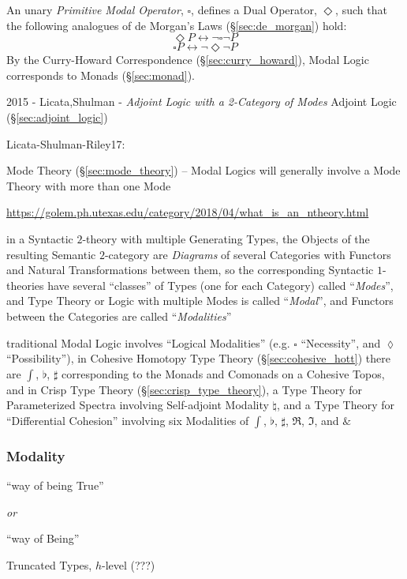 An unary \emph{Primitive Modal Operator}, $\square$, defines a Dual
Operator, $\Diamond$, such that the following analogues of de Morgan's
Laws (\S\ref{sec:de_morgan}) hold:
\[
  \Diamond P \leftrightarrow \neg \square \neg P
\]
\[
  \square P \leftrightarrow \neg \Diamond \neg P
\]
By the Curry-Howard Correspondence (\S\ref{sec:curry_howard}), Modal
Logic corresponds to Monads (\S\ref{sec:monad}).

\asterism

2015 - Licata,Shulman - \emph{Adjoint Logic with a 2-Category of Modes} \fist
Adjoint Logic (\S\ref{sec:adjoint_logic})

Licata-Shulman-Riley17:

\fist Mode Theory (\S\ref{sec:mode_theory}) -- Modal Logics will generally
involve a Mode Theory with more than one Mode

\url{https://golem.ph.utexas.edu/category/2018/04/what_is_an_ntheory.html}

in a Syntactic $2$-theory with multiple Generating Types, the Objects of the
resulting Semantic $2$-category are \emph{Diagrams} of several Categories with
Functors and Natural Transformations between them, so the corresponding
Syntactic $1$-theories have several ``classes'' of Types (one for each
Category) called ``\emph{Modes}'', and Type Theory or Logic with multiple Modes
is called ``\emph{Modal}'', and Functors between the Categories are called
``\emph{Modalities}''

traditional Modal Logic involves ``Logical Modalities'' (e.g. $\square$
``Necessity'', and $\lozenge$ ``Possibility''), in Cohesive Homotopy Type
Theory (\S\ref{sec:cohesive_hott}) there are $\int$, $\flat$, $\sharp$
corresponding to the Monads and Comonads on a Cohesive Topos,
and in Crisp Type Theory (\S\ref{sec:crisp_type_theory}), a Type Theory for
Parameterized Spectra involving Self-adjoint Modality $\natural$, and a Type
Theory for ``Differential Cohesion'' involving six Modalities of $\int$,
$\flat$, $\sharp$, $\mathfrak{R}$, $\mathfrak{I}$, and $\&$



\subsubsection{Modality}\label{sec:modality}

``way of being True''

\emph{or}

``way of Being''

Truncated Types, $h$-level (???) %

